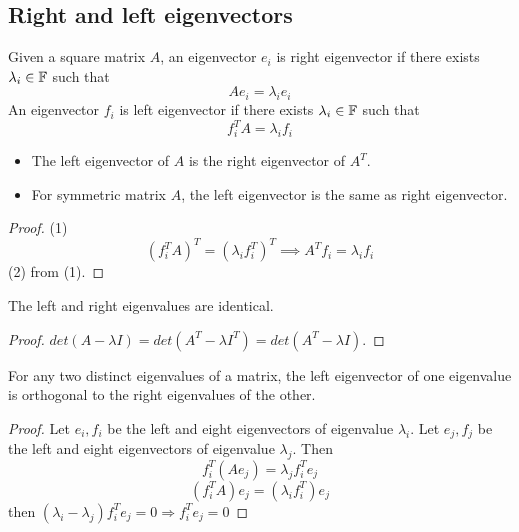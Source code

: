 \begin{refsection}
\subsection{Right and left eigenvectors}
\begin{definition}
\cite[82]{luenberger1979introduction}Given a square matrix $A$, an eigenvector $e_i$ is right eigenvector if there exists $\lambda_i \in \mathbb{F}$ such that
$$Ae_i = \lambda_i e_i$$
An eigenvector $f_i$ is left eigenvector if there exists $\lambda_i \in \mathbb{F}$ such that
$$f_i^TA = \lambda_i f_i$$
\end{definition}

\begin{lemma}\hfill
\begin{itemize}
	\item The left eigenvector of $A$ is the right eigenvector of $A^T$.
	\item For symmetric matrix $A$, the left eigenvector is the same as right eigenvector.
\end{itemize}	
\end{lemma}
\begin{proof}
(1)$$(f_i^TA)^T = (\lambda_i f_i^T)^T \implies A^Tf_i = \lambda_i f_i$$
(2) from (1).
\end{proof}


\begin{lemma}\label{ch:linearalgebra:th:leftrighteigenvalue}
The left and right eigenvalues are identical.
\end{lemma}

\begin{proof}
$det(A-\lambda I) = det(A^T-\lambda I^T) = det(A^T-\lambda I)$.
\end{proof}


\begin{theorem}\label{ch:linearalgebra:th:leftrighteigenvectororthogonality}
\cite[83]{luenberger1979introduction}\label{ch:linearalgebra:th:leftrightorthogonality} For any two distinct eigenvalues of a matrix, the left eigenvector of one eigenvalue is orthogonal to the right eigenvalues of the other.
\end{theorem}
\begin{proof}
Let $e_i,f_i$ be the left and eight eigenvectors of eigenvalue $\lambda_i$.
 Let $e_j,f_j$ be the left and eight eigenvectors of eigenvalue $\lambda_j$. 
 Then
 $$f_i^T (Ae_j) = \lambda_j f_i^Te_j $$
 $$(f_i^T A)e_j = (\lambda_i f_i^T)e_j $$
 then $(\lambda_i - \lambda_j)f_i^Te_j = 0 \Rightarrow f_i^Te_j = 0$
\end{proof}


\end{refsection}
